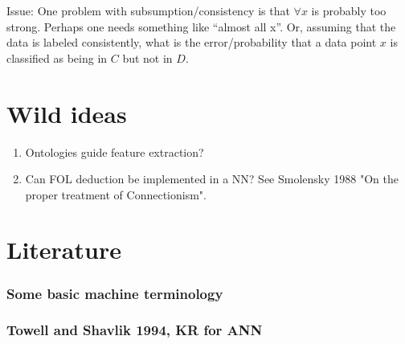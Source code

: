 \documentclass[a4paper,10pt]{article}
\begin{document}
Issue: One problem with subsumption/consistency is that $\forall x$ is probably too strong. Perhaps one needs something like ``almost all x''. Or, assuming that the data is labeled consistently, what is the error/probability that a data point $x$ is classified as being in $C$ but not in $D$.
% 
% 
% 



\section{Wild ideas}

\begin{enumerate}
\item Ontologies guide feature extraction?
\item Can FOL deduction be implemented in a NN? See Smolensky 1988 "On the proper treatment of Connectionism".
\end{enumerate}

\section{Literature} \label{sec:lit}

\subsubsection{Some basic machine terminology}

\subsubsection{Towell and Shavlik 1994, KR for ANN}
\end{document}
